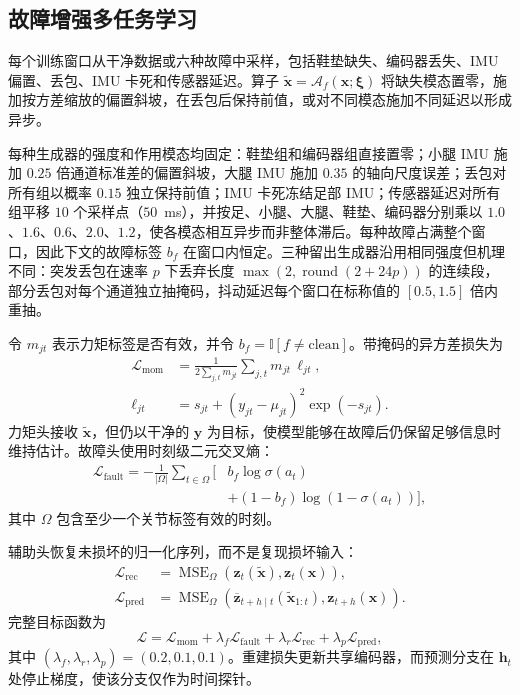 \documentclass[UTF8]{ctexart}
\begin{document}
\subsection{故障增强多任务学习}

每个训练窗口从干净数据或六种故障中采样，包括鞋垫缺失、编码器丢失、IMU 偏置、丢包、IMU 卡死和传感器延迟。算子 $\widetilde{\mathbf{x}}=\mathcal{A}_f(\mathbf{x};\boldsymbol{\xi})$ 将缺失模态置零，施加按方差缩放的偏置斜坡，在丢包后保持前值，或对不同模态施加不同延迟以形成异步。

每种生成器的强度和作用模态均固定：鞋垫组和编码器组直接置零；小腿 IMU 施加 $0.25$ 倍通道标准差的偏置斜坡，大腿 IMU 施加 $0.35$ 的轴向尺度误差；丢包对所有组以概率 $0.15$ 独立保持前值；IMU 卡死冻结足部 IMU；传感器延迟对所有组平移 $10$ 个采样点（$50$~ms），并按足、小腿、大腿、鞋垫、编码器分别乘以 $1.0$、$1.6$、$0.6$、$2.0$、$1.2$，使各模态相互异步而非整体滞后。每种故障占满整个窗口，因此下文的故障标签 $b_f$ 在窗口内恒定。三种留出生成器沿用相同强度但机理不同：突发丢包在速率 $p$ 下丢弃长度 $\max(2,\operatorname{round}(2+24p))$ 的连续段，部分丢包对每个通道独立抽掩码，抖动延迟每个窗口在标称值的 $[0.5,1.5]$ 倍内重抽。

令 $m_{jt}$ 表示力矩标签是否有效，并令 $b_f=\mathbb{I}[f\neq\mathrm{clean}]$。带掩码的异方差损失为
\begin{equation}
\begin{aligned}
\mathcal{L}_{\mathrm{mom}}
&=\frac{1}{2\sum_{j,t}m_{jt}}\sum_{j,t}m_{jt}\,\ell_{jt},\\
\ell_{jt}&=s_{jt}+(y_{jt}-\mu_{jt})^2\exp(-s_{jt}).
\end{aligned}
\end{equation}
力矩头接收 $\widetilde{\mathbf{x}}$，但仍以干净的 $\mathbf{y}$ 为目标，使模型能够在故障后仍保留足够信息时维持估计。故障头使用时刻级二元交叉熵：
\begin{equation}
\begin{aligned}
\mathcal{L}_{\mathrm{fault}}=-\frac{1}{|\Omega|}\sum_{t\in\Omega}
\big[&b_f\log\sigma(a_t)\\
&+(1-b_f)\log(1-\sigma(a_t))\big],
\end{aligned}
\end{equation}
其中 $\Omega$ 包含至少一个关节标签有效的时刻。

辅助头恢复未损坏的归一化序列，而不是复现损坏输入：
\begin{align}
\mathcal{L}_{\mathrm{rec}} & = \operatorname{MSE}_{\Omega}
\left(\widehat{\mathbf{z}}_t(\widetilde{\mathbf{x}}),\mathbf{z}_t(\mathbf{x})\right),\\
\mathcal{L}_{\mathrm{pred}} & = \operatorname{MSE}_{\Omega}
\left(\overline{\mathbf{z}}_{t+h\mid t}(\widetilde{\mathbf{x}}_{1:t}),\mathbf{z}_{t+h}(\mathbf{x})\right).
\end{align}
完整目标函数为
\begin{equation}
    \mathcal{L}=\mathcal{L}_{\mathrm{mom}}+
    \lambda_f\mathcal{L}_{\mathrm{fault}}+
    \lambda_r\mathcal{L}_{\mathrm{rec}}+
    \lambda_p\mathcal{L}_{\mathrm{pred}},
\end{equation}
其中 $(\lambda_f,\lambda_r,\lambda_p)=(0.2,0.1,0.1)$。重建损失更新共享编码器，而预测分支在 $\mathbf{h}_t$ 处停止梯度，使该分支仅作为时间探针。
\end{document}

